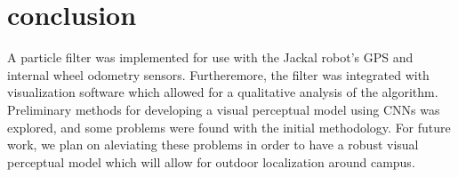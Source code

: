 \documentclass[letterpaper, 12 pt, conference]{ieeeconf}  %
\begin{document}
\section{conclusion}

A particle filter was implemented for use with the Jackal robot's GPS and internal wheel odometry sensors. Furtheremore, the filter was integrated with visualization software which allowed for a qualitative analysis of the algorithm. Preliminary methods for developing a visual perceptual model using CNNs was explored, and some problems were found with the initial methodology. For future work, we plan on aleviating these problems in order to have a robust visual perceptual model which will allow for outdoor localization around campus. 

\addtolength{\textheight}{-12cm}   %







\end{document}
